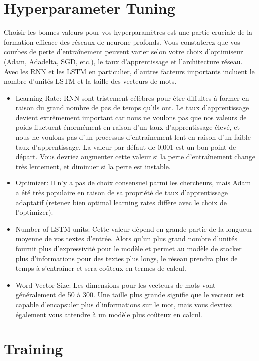 \documentclass[11pt]{article}
\begin{document}
    \section{Hyperparameter Tuning}\label{hyperparameter-tuning}

    Choisir les bonnes valeurs pour vos hyperparamètres est une partie
cruciale de la formation efficace des réseaux de neurone profonds. Vous
constaterez que vos courbes de perte d'entraînement peuvent varier selon
votre choix d'optimiseur (Adam, Adadelta, SGD, etc.), le taux
d'apprentissage et l'architecture réseau. Avec les RNN et les LSTM en
particulier, d'autres facteurs importants incluent le nombre d'unités
LSTM et la taille des vecteurs de mots.

\begin{itemize}
\item
  Learning Rate: RNN sont tristement célèbres pour être diffultes à
  former en raison du grand nombre de pas de temps qu'ils ont. Le taux
  d'apprentissage devient extrêmement important car nous ne voulons pas
  que nos valeurs de poids fluctuent énormément en raison d'un taux
  d'apprentissage élevé, et nous ne voulons pas d'un processus
  d'entraînement lent en raison d'un faible taux d'apprentissage. La
  valeur par défaut de 0,001 est un bon point de départ. Vous devriez
  augmenter cette valeur si la perte d'entraînement change très
  lentement, et diminuer si la perte est instable.
\item
  Optimizer: Il n'y a pas de choix consensuel parmi les chercheurs, mais
  Adam a été très populaire en raison de sa propriété de taux
  d'apprentissage adaptatif (retenez bien optimal learning rates diffère
  avec le choix de l'optimizer).
\item
  Number of LSTM units: Cette valeur dépend en grande partie de la
  longueur moyenne de vos textes d'entrée. Alors qu'un plus grand nombre
  d'unités fournit plus d'expressivité pour le modèle et permet au
  modèle de stocker plus d'informations pour des textes plus longs, le
  réseau prendra plus de temps à s'entraîner et sera coûteux en termes
  de calcul.
\item
  Word Vector Size: Les dimensions pour les vecteurs de mots vont
  généralement de 50 à 300. Une taille plus grande signifie que le
  vecteur est capable d'encapsuler plus d'informations sur le mot, mais
  vous devriez également vous attendre à un modèle plus coûteux en
  calcul.
\end{itemize}

    \section{Training}\label{training}
\end{document}
